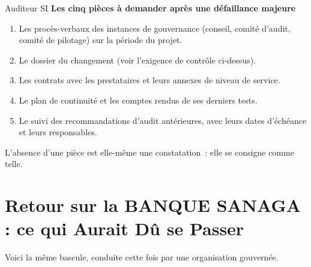 \begin{boxmetier}{Auditeur SI}
\textbf{Les cinq pièces à demander après une défaillance majeure}
\begin{enumerate}
    \item Les procès-verbaux des instances de gouvernance (conseil, comité
          d'audit, comité de pilotage) sur la période du projet.
    \item Le dossier du changement (voir l'exigence de contrôle ci-dessus).
    \item Les contrats avec les prestataires et leurs annexes de niveau de
          service.
    \item Le plan de continuité et les comptes rendus de ses derniers
          tests.
    \item Le suivi des recommandations d'audit antérieures, avec leurs
          dates d'échéance et leurs responsables.
\end{enumerate}
L'absence d'une pièce est elle-même une constatation~: elle se consigne
comme telle.
\end{boxmetier}

\section{Retour sur la BANQUE SANAGA : ce qui Aurait Dû se Passer}
\label{sec:pro-retour-sanaga}

Voici la même bascule, conduite cette fois par une organisation gouvernée.


